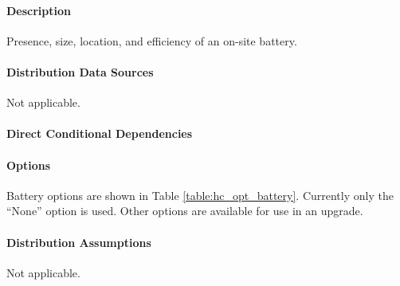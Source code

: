 \paragraph{Description}
% 
Presence, size, location, and efficiency of an on-site battery.

\paragraph{Distribution Data Sources}
% 
Not applicable.

\paragraph{Direct Conditional Dependencies}


\paragraph{Options}
Battery options are shown in Table \ref{table:hc_opt_battery}. Currently only the ``None'' option is used. Other options are available for use in an upgrade.



\paragraph{Distribution Assumptions}
% 
Not applicable.
